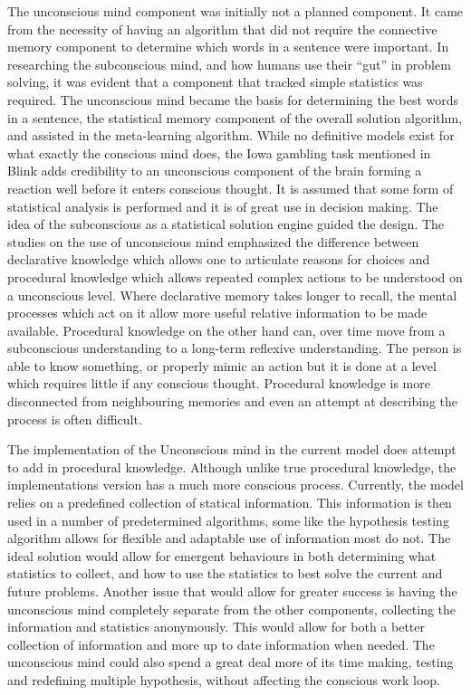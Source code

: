 The unconscious mind component was initially not a planned component.  It came from the necessity of having an algorithm that did not require
the connective memory component to determine which words in a sentence were important. In researching the subconscious mind, and how humans use their ``gut'' in problem solving, it was evident that a component that tracked simple statistics was required. The unconscious mind became the basis for determining the best words in a sentence, the statistical memory component of the overall solution algorithm, and assisted in the meta-learning algorithm.  While no definitive models exist for what exactly the conscious mind does, the Iowa gambling task \cite{Bechara1, Bechara2} mentioned in Blink \cite{BLINK} adds credibility to an unconscious component of the brain forming a reaction well before it enters conscious thought. It is assumed that some form of statistical analysis is performed and it is of great use in decision making.  The idea of the subconscious as a statistical solution engine guided the design.  The studies on the use of unconscious mind emphasized the difference between declarative knowledge which allows one to articulate reasons for choices and procedural knowledge which allows repeated complex actions to be understood on a unconscious level.  Where declarative memory takes longer to recall, the mental processes which act on it allow more useful relative information to be made available.  Procedural knowledge on the other hand can, over time move from a subconscious understanding to a long-term reflexive understanding.  The person is able to know something, or properly mimic an action but it is done at a level which requires little if any conscious thought.  Procedural knowledge is more disconnected from neighbouring memories and even an attempt at describing the process is often difficult. 

The implementation of the Unconscious mind in the current model does attempt to add in procedural knowledge.  Although unlike true procedural knowledge, the implementations version has a much more conscious process.  Currently, the model relies on a predefined collection of statical information.  This information is then used in a number of predetermined algorithms, some like the hypothesis testing algorithm allows for flexible and adaptable use of information most do not.  The ideal solution would allow for emergent behaviours in both determining what statistics to collect, and how to use the statistics to best solve the current and future problems.  Another issue that would allow for greater success is having the unconscious mind completely separate from the other components, collecting the information and statistics anonymously. This would allow for both a better collection of information and more up to date information when needed.  The unconscious mind could also spend a great deal more of its time making, testing and redefining multiple hypothesis, without affecting the conscious work loop. 

